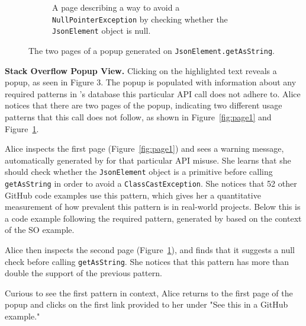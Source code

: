 \begin{figure}
\begin{subfigure}[b]{0.48\textwidth}
  \caption{A page describing a way to avoid a {\tt NullPointerException} by checking whether the {\tt JsonElement} object is null.}
  \vspace{.1in}
  \label{fig:page2}
  \end{subfigure}
  \hfill
\caption{The two pages of a popup generated on {\tt JsonElement.getAsString}.}
\label{fig:features}
\end{figure}


{\bf Stack Overflow Popup View.}
Clicking on the highlighted text reveals a popup, as seen in Figure 3. The popup is populated with information about any required patterns in {\soa}'s database this particular API call does not adhere to. Alice notices that there are two pages of the popup, indicating two different usage patterns that this call does not follow, as shown in Figure~\ref{fig:page1} and Figure~\ref{fig:page2}. 

Alice inspects the first page (Figure~\ref{fig:page1}) and sees a warning message, automatically generated by {\soa} for that particular API misuse. She learns that she should check whether the {\tt JsonElement} object is a primitive before calling {\tt getAsString} in order to avoid a {\tt ClassCastException}. She notices that 52 other GitHub code examples use this pattern, which gives her a quantitative measurement of how prevalent this pattern is in real-world projects. Below this is a code example following the required pattern, generated by {\soa} based on the context of the SO example.

Alice then inspects the second page (Figure~\ref{fig:page2}), and finds that it suggests a null check before calling {\tt getAsString}. She notices that this pattern has more than double the support of the previous pattern.

Curious to see the first pattern in context, Alice returns to the first page of the popup and clicks on the first link provided to her under "See this in a GitHub example."

